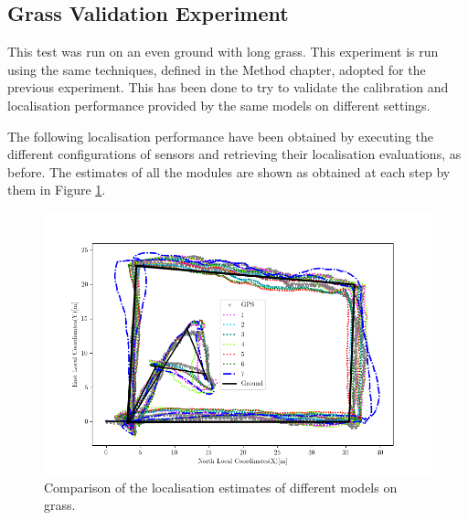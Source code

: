 \subsection{Grass Validation Experiment }
\noindent
This test was run on an even ground with long grass.
This experiment is run using the same techniques, defined in the Method chapter, adopted for the previous experiment.
This has been done to try to validate the calibration and localisation performance provided by the same models on different settings.

The following localisation performance have been obtained by executing the different configurations of sensors and retrieving their localisation evaluations, as before.
The estimates of all the modules are shown as obtained at each step by them in Figure \ref{fig:grass-models}.
\begin{figure}[!ht]
			\begin{center}
				\includegraphics[clip, width=1 \textwidth]{Images/5-Results/GrassLoc.png} %
			\end{center}
			\caption{Comparison of the localisation estimates of different models on grass.}
	\label{fig:grass-models}
\end{figure}

